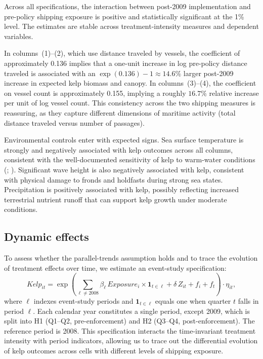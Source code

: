 \documentclass[12pt]{article}
\begin{document}
Across all specifications, the interaction between post-2009 implementation and pre-policy shipping exposure is positive and statistically significant at the 1\% level. The estimates are stable across treatment-intensity measures and dependent variables.

In columns~(1)--(2), which use distance traveled by vessels, the coefficient of approximately 0.136 implies that a one-unit increase in log pre-policy distance traveled is associated with an $\exp(0.136)-1\approx 14.6\%$ larger post-2009 increase in expected kelp biomass and canopy. In columns~(3)--(4), the coefficient on vessel count is approximately 0.155, implying a roughly $16.7\%$ relative increase per unit of log vessel count. This consistency across the two shipping measures is reassuring, as they capture different dimensions of maritime activity (total distance traveled versus number of passages).

Environmental controls enter with expected signs. Sea surface temperature is strongly and negatively associated with kelp outcomes across all columns, consistent with the well-documented sensitivity of kelp to warm-water conditions (\citealp{Carr2019}; \citealp{RogersBennett2019}). Significant wave height is also negatively associated with kelp, consistent with physical damage to fronds and holdfasts during strong sea states. Precipitation is positively associated with kelp, possibly reflecting increased terrestrial nutrient runoff that can support kelp growth under moderate conditions.

\subsection{Dynamic effects}
\label{sec:dynamic}

To assess whether the parallel-trends assumption holds and to trace the evolution of treatment effects over time, we estimate an event-study specification:
\begin{equation}
Kelp_{it}=\exp\!\left(\sum_{\ell\neq 2008}\beta_{\ell}\,Exposure_{i}\times\mathbf{1}_{t\in\ell}+\delta\,Z_{it}+f_{i}+f_{t}\right)\cdot\eta_{it},
\label{eq:es}
\end{equation}
where $\ell$ indexes event-study periods and $\mathbf{1}_{t\in\ell}$ equals one when quarter $t$ falls in period $\ell$. Each calendar year constitutes a single period, except 2009, which is split into H1 (Q1--Q2, pre-enforcement) and H2 (Q3--Q4, post-enforcement). The reference period is 2008. This specification interacts the time-invariant treatment intensity with period indicators, allowing us to trace out the differential evolution of kelp outcomes across cells with different levels of shipping exposure.
\end{document}
